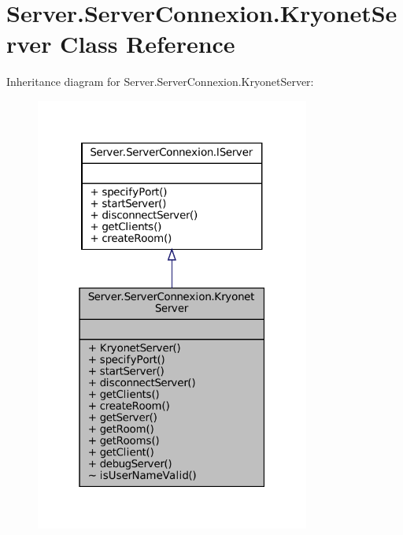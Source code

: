 \hypertarget{classServer_1_1ServerConnexion_1_1KryonetServer}{}\section{Server.\+Server\+Connexion.\+Kryonet\+Server Class Reference}
\label{classServer_1_1ServerConnexion_1_1KryonetServer}


Inheritance diagram for Server.\+Server\+Connexion.\+Kryonet\+Server\+:
\nopagebreak
\begin{figure}[H]
\begin{center}
\leavevmode
\includegraphics[width=256pt]{classServer_1_1ServerConnexion_1_1KryonetServer__inherit__graph}
\end{center}
\end{figure}


